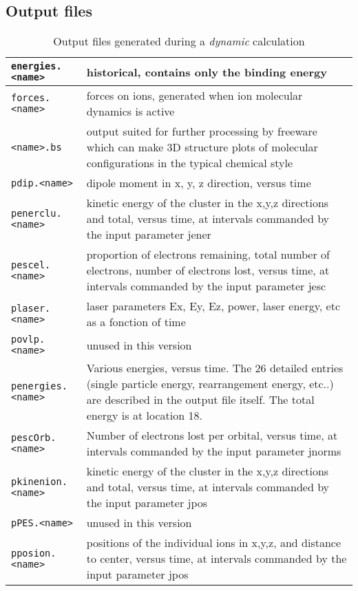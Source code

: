 \documentclass[11pt,a4paper]{article}
\begin{document}
		\subsection{Output files}
			\begin{table}[h!]
				\caption{Output files generated during a \emph{dynamic} calculation}\label{tab:dynamic-output-files}
				\begin{tabular}{|p{4.5cm}|p{10.2cm}|}
					\hline
					\texttt{energies.<name>} & historical, contains only the binding energy\\
					\hline
					\texttt{forces.<name>} & forces on ions, generated when ion molecular dynamics is active\\
					\hline
					\texttt{<name>.bs} & output suited for further processing by freeware which  can make 3D structure plots of molecular configurations in the typical chemical style\\
					\hline
					\texttt{pdip.<name>} &  dipole moment in x, y, z direction, versus time \\
					\hline
					\texttt{penerclu.<name>} & kinetic energy of the cluster in the x,y,z directions and total, versus time, at intervals commanded by the input parameter jener\\
					\hline
					\texttt{pescel.<name>} & proportion of electrons remaining, total number of electrons, number of electrons lost, versus time, at intervals commanded by the input parameter jesc\\
					\hline
					\texttt{plaser.<name>} & laser parameters Ex, Ey, Ez, power, laser energy, etc as a fonction of time\\
					\hline
					\texttt{povlp.<name>} & unused in this version\\
					\hline
					\texttt{penergies.<name>} & Various energies, versus time. The 26 detailed entries (single particle energy, rearrangement energy, etc..) are described in the output file itself. The total energy is at location 18. \\
					\hline
					\texttt{pescOrb.<name>} & Number of electrons lost per orbital, versus time, at intervals commanded by the input parameter jnorms \\
					\hline
					\texttt{pkinenion.<name>} & kinetic energy of the cluster in the x,y,z directions and total, versus time, at intervals commanded by the input parameter jpos\\
					\hline
					\texttt{pPES.<name>} & unused in this version\\
					\hline
					\texttt{pposion.<name>} & positions of the individual ions in x,y,z, and distance to center, versus time, at intervals commanded by the input parameter jpos\\

\end{tabular}
\end{table}
\end{document}
